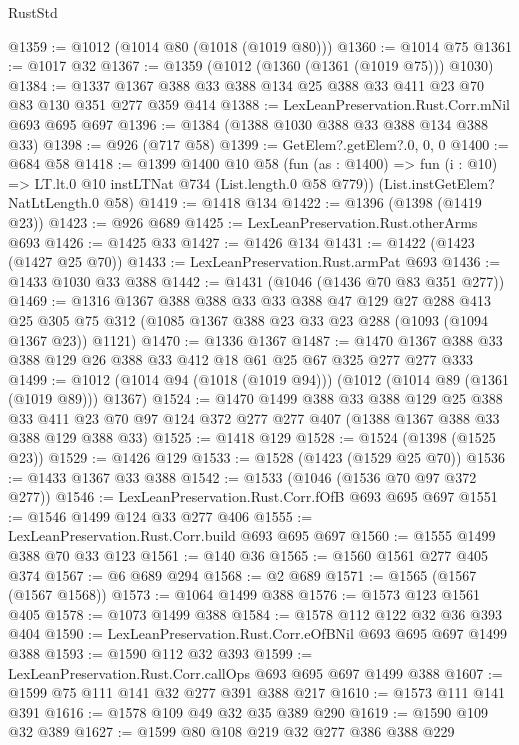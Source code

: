 \begin{lexlean}{RustStd}
\begin{coremodule}
{\begin{coremodule}
{{{{{{{{@1359 := @1012 (@1014 @80 (@1018 (@1019 @80)))
@1360 := @1014 @75
@1361 := @1017 @32
@1367 := @1359 (@1012 (@1360 (@1361 (@1019 @75))) @1030)
@1384 := @1337 @1367 @388 @33 @388 @134 @25 @388 @33 @411 @23 @70 @83 @130 @351 @277 @359 @414
@1388 := LexLeanPreservation.Rust.Corr.mNil @693 @695 @697
@1396 := @1384 (@1388 @1030 @388 @33 @388 @134 @388 @33)
@1398 := @926 (@717 @58)
@1399 := GetElem?.getElem?.{0, 0, 0}
@1400 := @684 @58
@1418 := @1399
    @1400
    @10
    @58
    (fun (as : @1400) => fun (i : @10) => LT.lt.{0} @10 instLTNat @734 (List.length.{0} @58 @779))
    (List.instGetElem?NatLtLength.{0} @58)
@1419 := @1418 @134
@1422 := @1396 (@1398 (@1419 @23))
@1423 := @926 @689
@1425 := LexLeanPreservation.Rust.otherArms @693
@1426 := @1425 @33
@1427 := @1426 @134
@1431 := @1422 (@1423 (@1427 @25 @70))
@1433 := LexLeanPreservation.Rust.armPat @693
@1436 := @1433 @1030 @33 @388
@1442 := @1431 (@1046 (@1436 @70 @83 @351 @277))
@1469 := @1316
    @1367
    @388
    @388
    @33
    @33
    @388
    @47
    @129
    @27
    @288
    @413
    @25
    @305
    @75
    @312
    (@1085 @1367 @388 @23 @33 @23 @288 (@1093 (@1094 @1367 @23)) @1121)
@1470 := @1336 @1367
@1487 := @1470 @1367 @388 @33 @388 @129 @26 @388 @33 @412 @18 @61 @25 @67 @325 @277 @277 @333
@1499 := @1012 (@1014 @94 (@1018 (@1019 @94))) (@1012 (@1014 @89 (@1361 (@1019 @89))) @1367)
@1524 := @1470
    @1499
    @388
    @33
    @388
    @129
    @25
    @388
    @33
    @411
    @23
    @70
    @97
    @124
    @372
    @277
    @277
    @407
    (@1388 @1367 @388 @33 @388 @129 @388 @33)
@1525 := @1418 @129
@1528 := @1524 (@1398 (@1525 @23))
@1529 := @1426 @129
@1533 := @1528 (@1423 (@1529 @25 @70))
@1536 := @1433 @1367 @33 @388
@1542 := @1533 (@1046 (@1536 @70 @97 @372 @277))
@1546 := LexLeanPreservation.Rust.Corr.fOfB @693 @695 @697
@1551 := @1546 @1499 @124 @33 @277 @406
@1555 := LexLeanPreservation.Rust.Corr.build @693 @695 @697
@1560 := @1555 @1499 @388 @70 @33 @123
@1561 := @140 @36
@1565 := @1560 @1561 @277 @405 @374
@1567 := @6 @689 @294
@1568 := @2 @689
@1571 := @1565 (@1567 (@1567 @1568))
@1573 := @1064 @1499 @388
@1576 := @1573 @123 @1561 @405
@1578 := @1073 @1499 @388
@1584 := @1578 @112 @122 @32 @36 @393 @404
@1590 := LexLeanPreservation.Rust.Corr.eOfBNil @693 @695 @697 @1499 @388
@1593 := @1590 @112 @32 @393
@1599 := LexLeanPreservation.Rust.Corr.callOps @693 @695 @697 @1499 @388
@1607 := @1599 @75 @111 @141 @32 @277 @391 @388 @217
@1610 := @1573 @111 @141 @391
@1616 := @1578 @109 @49 @32 @35 @389 @290
@1619 := @1590 @109 @32 @389
@1627 := @1599 @80 @108 @219 @32 @277 @386 @388 @229
}}}}}}}}
\end{coremodule}}
\end{coremodule}
\end{lexlean}
